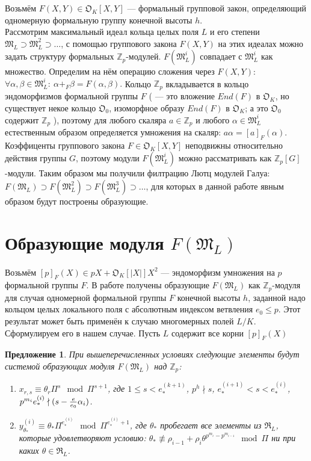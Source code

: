 \documentclass[a4paper]{article}
\newcommand{\Zp}{\mathbb{Z}_p}
\newcommand{\ML}{\mathfrak{M}_L}
\newcommand{\OK}{\mathfrak{O}_K}
\newcommand{\RL}{\mathfrak{R}_L}
\newtheorem{proposition}{Предложение}
\begin{document}
Возьмём $F(X,Y)\in\OK[X,Y]$ --- формальный групповой закон, определяющий одномерную формальную группу конечной высоты $h$.\\ 
Рассмотрим максимальный идеал кольца целых поля $L$ и его степени $\ML\supset\ML^2\supset\dots$, с помощью группового закона $F(X,Y)$ на этих идеалах можно задать структуру формальных $\Zp$-модулей. $F(\ML^i)$ совпадает с $\ML^i$ как множество. Определим на нём операцию сложения через $F(X,Y)$: $\forall\alpha,\beta\in\ML^i:\ \alpha+_F\beta=F(\alpha,\beta).$ Кольцо $\Zp$ вкладывается в кольцо эндоморфизмов формальной группы $F$ (\cite[\S 2]{book6} --- это вложение $End(F)$ в $\OK$, но существует некое кольцо $\mathfrak{O}_0$, изоморфное образу $End(F)$ в $\OK$; а это $\mathfrak{O}_0$ содержит $\Zp$ \cite[\S2.3]{book6}), поэтому для любого скаляра $a\in\Zp$ и любого $\alpha\in\ML^i$ естественным образом определяется умножения на скаляр: $a\alpha=[a]_F(\alpha)$.\\
Коэффиценты группового закона $F \in \OK[X,Y]$ неподвижны относительно действия группы $G$, поэтому модули $F(\ML^i)$ можно рассматривать как $\Zp[G]$-модули. Таким образом мы получили филтрацию Лютц модулей Галуа: $F(\ML) \supset F(\ML^2) \supset F(\ML^3) \supset \ldots$, для которых в данной работе явным образом будут построены образующие.

\section{Образующие модуля $F(\ML)$}
\paragraph{}
Возьмём $[p]_F(X) \in pX+\OK[|X|]X^2$ --- эндоморфизм умножения на $p$ формальной группы $F$. В работе \cite[Арифметика формального модуля]{book2} получены образующие $F(\ML)$ как $\Zp$-модуля для случая одномерной формальной группы $F$ конечной высоты $h$, заданной надо кольцом целых локального поля с абсолютным индексом ветвления $e_0 \leq p$. Этот результат может быть применён к случаю многомерных полей $L/K$. Сформулируем его в нашем случае.
Пусть $L$ содержит все корни $[p]_F(X)$
\begin{proposition}
	При вышеперечисленных условиях следующие элементы будут системой образующих модуля $F(\ML)$ над $\Zp$:
	\begin{enumerate}
		\item $x_{r,s} \equiv \theta_r\Pi^s \mod \Pi^{s+1}$, где $1 \leq s < e_*^{(k+1)}$, $p^h \nmid s$, $e_*^{(i+1)} < s < e_*^{(i)}$, $p^{m_i}e_*^{(i)} \nmid (s - {e \over e_0}\alpha_i)$. 
		\item $y_{\theta_*}^{(i)} \equiv \theta_*\Pi^{e_*^{(i)}} \mod \Pi^{e_*^{(i)} + 1}$, где $\theta_*$ пробегает все элементы из $\RL$, которые удовлетворяют условию: $\theta_* \not\equiv \rho_{i-1} + \rho_i\theta^{p^{m_i} - p^{m_{i-1}}} \mod \Pi$ ни при каких $\theta \in \RL$.
	\end{enumerate}
	
\end{proposition}
\end{document}
